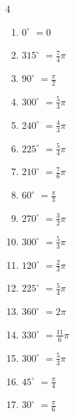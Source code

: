 \begin{multicols}{4}
\begin{enumerate}
  \item $\displaystyle 0^{\circ}$
        $\displaystyle =0$

  \item $\displaystyle 315^{\circ}$
        $\displaystyle =\frac{7}{4}\pi$

  \item $\displaystyle 90^{\circ}$
        $\displaystyle =\frac{\pi}{2}$

  \item $\displaystyle 300^{\circ}$
        $\displaystyle =\frac{5}{3}\pi$

  \item $\displaystyle 240^{\circ}$
        $\displaystyle =\frac{4}{3}\pi$

  \item $\displaystyle 225^{\circ}$
        $\displaystyle =\frac{5}{4}\pi$

  \item $\displaystyle 210^{\circ}$
        $\displaystyle =\frac{7}{6}\pi$

  \item $\displaystyle 60^{\circ}$
        $\displaystyle =\frac{\pi}{3}$

  \item $\displaystyle 270^{\circ}$
        $\displaystyle =\frac{3}{2}\pi$

  \item $\displaystyle 300^{\circ}$
        $\displaystyle =\frac{5}{3}\pi$

  \item $\displaystyle 120^{\circ}$
        $\displaystyle =\frac{2}{3}\pi$

  \item $\displaystyle 225^{\circ}$
        $\displaystyle =\frac{5}{4}\pi$

  \item $\displaystyle 360^{\circ}$
        $\displaystyle =2\pi$

  \item $\displaystyle 330^{\circ}$
        $\displaystyle =\frac{11}{6}\pi$

  \item $\displaystyle 300^{\circ}$
        $\displaystyle =\frac{5}{3}\pi$

  \item $\displaystyle 45^{\circ}$
        $\displaystyle =\frac{\pi}{4}$

  \item $\displaystyle 30^{\circ}$
        $\displaystyle =\frac{\pi}{6}$


\end{enumerate}
\end{multicols}
